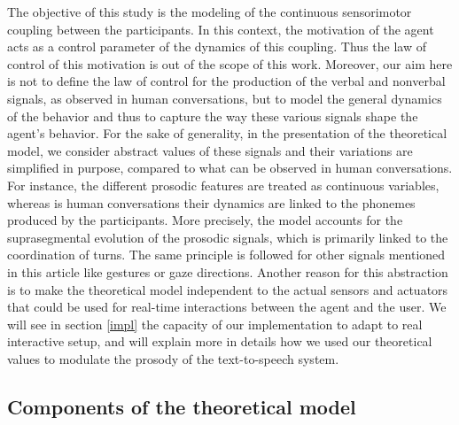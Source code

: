 The objective of this study is the modeling of the continuous sensorimotor coupling between the participants. In this context, the motivation of the agent acts as a control parameter of the dynamics of this coupling. Thus the law of control of this motivation is out of the scope of this work.
Moreover, our aim here is not to define the law of control for the production of the verbal and nonverbal signals, as observed in human conversations, but to model the general dynamics of the behavior and thus to capture the way these various signals shape the agent's behavior. For the sake of generality, in the presentation of the theoretical model, we consider abstract values of these signals and their variations are simplified in purpose, compared to what can be observed in human conversations.
For instance, the different prosodic features are treated as continuous variables, whereas is human conversations their dynamics are linked to the phonemes produced by the participants. More precisely, the model accounts for the suprasegmental evolution of the prosodic signals, which is primarily linked to the coordination of turns.
The same principle is followed for other signals mentioned in this article like gestures or gaze directions. 
Another reason for this abstraction %
is to make the  theoretical model independent to the actual sensors and actuators that could be used for real-time interactions between the agent and the user. 
We will see in section \ref{impl} the capacity of our implementation to adapt to real interactive setup, and will explain more in details how we used our theoretical values to modulate the prosody of the text-to-speech system.

\subsection{Components of the theoretical model}

